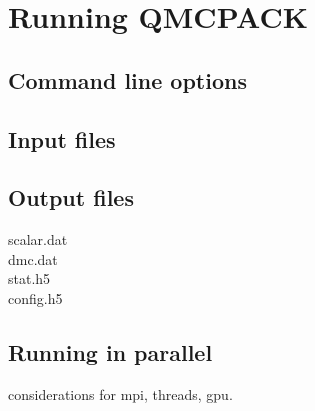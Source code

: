 \chapter{Running QMCPACK}
\section{Command line options}
\section{Input files}
\section{Output files}
  scalar.dat\\
  dmc.dat\\
  stat.h5\\
  config.h5
\section{Running in parallel}
considerations for mpi, threads, gpu.
